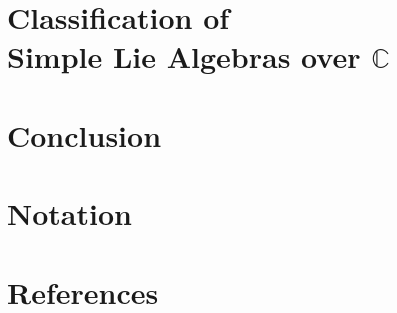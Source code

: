 \documentclass[12pt, twoside, openany]{book}
\newcommand{\1}{\mathbbm{1}}
\theoremstyle{definition}
\begin{document}
\chapter[Classification of Simple Lie Algebras over $\mathbb C$]{Classification of\\ Simple Lie Algebras over $\mathbb{C}$}

\chapter*{Conclusion}\thispagestyle{empty}



 

\chapter*{Notation}\thispagestyle{empty}

\chapter*{References}\thispagestyle{empty}


\printindex
\end{document}
